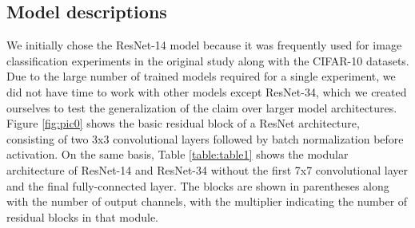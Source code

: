 \subsection{Model descriptions}
We initially chose the ResNet-14 model because it was frequently used for image classification experiments in the original study along with the CIFAR-10 datasets. Due to the large number of trained models required for a single experiment, we did not have time to work with other models except ResNet-34, which we created ourselves to test the generalization of the claim over larger model architectures. Figure \ref{fig:pic0} shows the basic residual block of a ResNet architecture, consisting of two 3x3 convolutional layers followed by batch normalization before activation. On the same basis, Table \ref{table:table1} shows the modular architecture of ResNet-14 and ResNet-34 \cite{he2016deep} without the first 7x7 convolutional layer and the final fully-connected layer. The blocks are shown in parentheses along with the number of output channels, with the multiplier indicating the number of residual blocks in that module. 
